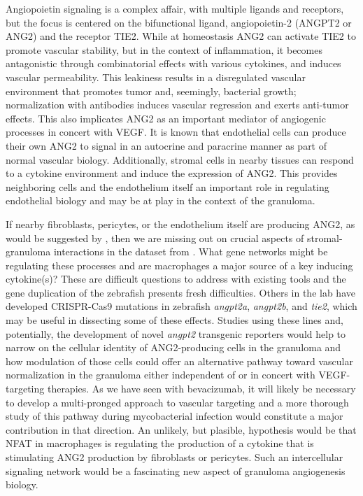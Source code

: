 Angiopoietin signaling is a complex affair, with multiple ligands and receptors, but the focus is centered on the bifunctional ligand, angiopoietin-2 (ANGPT2 or ANG2) and the receptor TIE2. While at homeostasis ANG2 can activate TIE2 to promote vascular stability, but in the context of inflammation, it becomes antagonistic through combinatorial effects with various cytokines, and induces vascular permeability. This leakiness results in a disregulated vascular environment that promotes tumor and, seemingly, bacterial growth; normalization with antibodies induces vascular regression and exerts anti-tumor effects. This also implicates ANG2 as an important mediator of angiogenic processes in concert with VEGF. It is known that endothelial cells can produce their own ANG2 to signal in an autocrine and paracrine manner as part of normal vascular biology. Additionally, stromal cells in nearby tissues can respond to a cytokine environment and induce the expression of ANG2. This provides neighboring cells and the endothelium itself an important role in regulating endothelial biology and may be at play in the context of the granuloma.

If nearby fibroblasts, pericytes, or the endothelium itself are producing ANG2, as would be suggested by \citet{Gideon2022}, then we are missing out on crucial aspects of stromal-granuloma interactions in the dataset from \citet{Cronan2021}. What gene networks might be regulating these processes and are macrophages a major source of a key inducing cytokine(s)? These are difficult questions to address with existing tools and the gene duplication of the zebrafish presents fresh difficulties. Others in the lab have developed CRISPR-Cas9 mutations in zebrafish \textit{angpt2a}, \textit{angpt2b}, and \textit{tie2}, which may be useful in dissecting some of these effects. Studies using these lines and, potentially, the development of novel \textit{angpt2} transgenic reporters would help to narrow on the cellular identity of ANG2-producing cells in the granuloma and how modulation of those cells could offer an alternative pathway toward vascular normalization in the granuloma either independent of or in concert with VEGF-targeting therapies. As we have seen with bevacizumab, it will likely be necessary to develop a multi-pronged approach to vascular targeting and a more thorough study of this pathway during mycobacterial infection would constitute a major contribution in that direction. An unlikely, but plasible, hypothesis would be that NFAT in macrophages is regulating the production of a cytokine that is stimulating ANG2 production by fibroblasts or pericytes. Such an intercellular signaling network would be a fascinating new aspect of granuloma angiogenesis biology.

